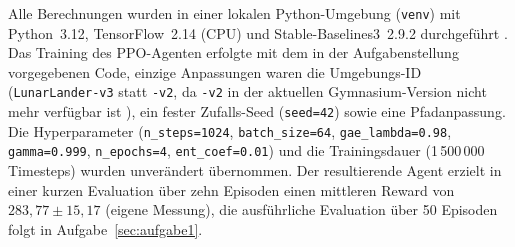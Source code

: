 Alle Berechnungen wurden in einer lokalen Python-Umgebung (\texttt{venv}) mit Python~3.12, TensorFlow~2.14 (\ac{CPU}) und Stable-Baselines3~2.9.2 durchgeführt \cite{5}. Das Training des \ac{PPO}-Agenten erfolgte mit dem in der Aufgabenstellung vorgegebenen Code, einzige Anpassungen waren die Umgebungs-ID (\texttt{LunarLander-v3} statt \texttt{-v2}, da \texttt{-v2} in der aktuellen Gymnasium-Version nicht mehr verfügbar ist \cite{4}), ein fester Zufalls-Seed (\texttt{seed=42}) sowie eine Pfadanpassung. Die Hyperparameter (\texttt{n\_steps=1024}, \texttt{batch\_size=64}, \texttt{gae\_lambda=0.98}, \texttt{gamma=0.999}, \texttt{n\_epochs=4}, \texttt{ent\_coef=0.01}) und die Trainingsdauer (1\,500\,000 Timesteps) wurden unverändert übernommen. Der resultierende Agent erzielt in einer kurzen Evaluation über zehn Episoden einen mittleren Reward von $283{,}77 \pm 15{,}17$ (eigene Messung), die ausführliche Evaluation über 50 Episoden folgt in Aufgabe~\ref{sec:aufgabe1}.

